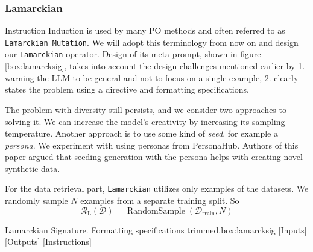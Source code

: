 \subsubsection{Lamarckian}
Instruction Induction\cite{honovich2022instructioninductionexamplesnatural} is used by many PO methods and often referred to as \texttt{Lamarckian Mutation}. 
We will adopt this terminology from now on and design our \texttt{Lamarckian} operator. 
Design of its meta-prompt, shown in figure \ref{box:lamarcksig}, takes into account the design challenges mentioned earlier by 1. warning the LLM to be general and not to focus on a single example, 
2. clearly states the problem using a directive and formatting specifications. 

The problem with diversity still persists, and we consider two approaches to solving it. 
We can increase the model's creativity by increasing its sampling temperature. Another approach is to use
some kind of \textit{seed}, for example a \textit{persona}. We experiment with using personas from PersonaHub\cite{ge2024scalingsyntheticdatacreation}.
Authors of this paper argued that seeding generation with the persona helps with creating novel synthetic data. 

For the data retrieval part, \texttt{Lamarckian} utilizes only examples of the datasets. 
We randomly sample $N$ examples from a separate training split. So
\begin{equation}
    \mathcal{R}_{\text{L}}(\mathcal{D}) = \operatorname{RandomSample}(\mathcal{D}_{\text{train}}, N)
\end{equation}
\begin{figurebox}{Lamarckian Signature. Formatting specifications trimmed.}{box:lamarcksig}
    [Inputs]
    [Outputs]
    [Instructions]
\end{figurebox}
\newpage
